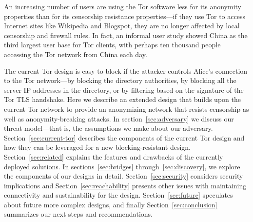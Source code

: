 \documentclass{llncs}
\begin{document}
An increasing number of users are using the Tor software
less for its anonymity properties than for its censorship
resistance properties---if they use Tor to access Internet sites like
Wikipedia
and Blogspot, they are no longer affected by local censorship
and firewall rules. In fact, an informal user study
showed China as the third largest user base
for Tor clients, with perhaps ten thousand people accessing the Tor
network from China each day.

The current Tor design is easy to block if the attacker controls Alice's
connection to the Tor network---by blocking the directory authorities,
by blocking all the server IP addresses in the directory, or by filtering
based on the signature of the Tor TLS handshake. Here we describe an
extended design that builds upon the current Tor network to provide an
anonymizing
network that resists censorship as well as anonymity-breaking attacks.
In section~\ref{sec:adversary} we discuss our threat model---that is,
the assumptions we make about our adversary. Section~\ref{sec:current-tor}
describes the components of the current Tor design and how they can be
leveraged for a new blocking-resistant design. Section~\ref{sec:related}
explains the features and drawbacks of the currently deployed solutions.
In sections~\ref{sec:bridges} through~\ref{sec:discovery}, we explore the
components of our designs in detail.  Section~\ref{sec:security} considers
security implications and Section~\ref{sec:reachability} presents other
issues with maintaining connectivity and sustainability for the design.
Section~\ref{sec:future} speculates about future more complex designs,
and finally Section~\ref{sec:conclusion} summarizes our next steps and
recommendations.



\end{document}
